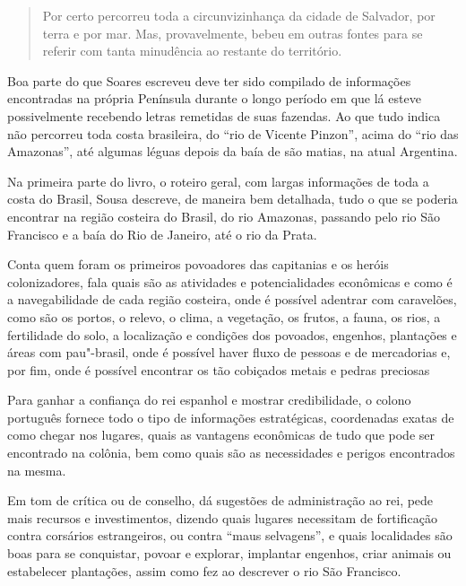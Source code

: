 \documentclass[12pt]{extarticle}
\begin{document}
\begin{quote}
Por certo percorreu toda a circunvizinhança da cidade de Salvador, por
terra e por mar. Mas, provavelmente, bebeu em outras fontes para se
referir com tanta minudência ao restante do território.
\end{quote}


Boa parte do que Soares escreveu deve ter sido compilado de informações
encontradas na própria Península durante o longo período em que lá
esteve possivelmente recebendo letras remetidas de suas fazendas. Ao que
tudo indica não percorreu toda costa brasileira, do ``rio de Vicente
Pinzon'', acima do ``rio das Amazonas'', até algumas léguas depois da
baía de são matias, na atual Argentina.

Na primeira parte do livro, o roteiro geral, com largas informações de
toda a costa do Brasil, Sousa descreve, de maneira bem detalhada, tudo o
que se poderia encontrar na região costeira do Brasil, do rio Amazonas,
passando pelo rio São Francisco e a baía do Rio de Janeiro, até o rio da
Prata.

Conta quem foram os primeiros povoadores das capitanias e os heróis
colonizadores, fala quais são as atividades e potencialidades econômicas
e como é a navegabilidade de cada região costeira, onde é possível
adentrar com caravelões, como são os portos, o relevo, o clima, a
vegetação, os frutos, a fauna, os rios, a fertilidade do solo, a
localização e condições dos povoados, engenhos, plantações e áreas com
pau"-brasil, onde é possível haver fluxo de pessoas e de mercadorias e,
por fim, onde é possível encontrar os tão cobiçados metais e pedras
preciosas

Para ganhar a confiança do rei espanhol e mostrar credibilidade, o
colono português fornece todo o tipo de informações estratégicas,
coordenadas exatas de como chegar nos lugares, quais as vantagens
econômicas de tudo que pode ser encontrado na colônia, bem como quais
são as necessidades e perigos encontrados na mesma.

Em tom de crítica ou de conselho, dá sugestões de administração ao rei,
pede mais recursos e investimentos, dizendo quais lugares necessitam de
fortificação contra corsários estrangeiros, ou contra ``maus
selvagens'', e quais localidades são boas para se conquistar, povoar e
explorar, implantar engenhos, criar animais ou estabelecer plantações,
assim como fez ao descrever o rio São Francisco.
\end{document}
